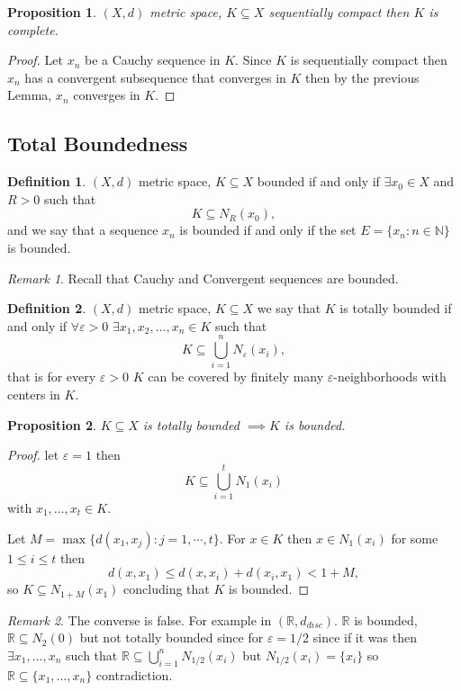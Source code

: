 \documentclass[11pt,openany]{book}
\theoremstyle{plain}
\newtheorem{proposition}{Proposition}[chapter]
\theoremstyle{definition}
\newtheorem{definition}{Definition}[chapter]
\theoremstyle{remark}
\newtheorem{remark}{Remark}[chapter]
\newcommand{\R}{\mathbb{R}}
\newcommand{\N}{\mathbb{N}}
\newcommand{\eps}{\varepsilon}
\begin{document}
\begin{proposition}\label{prop:sequentialimplycomplete}
    $(X,d)$ metric space, $K \subseteq X$ sequentially compact then $K$ is complete.
\end{proposition}

\begin{proof}
    Let $x_n$ be a Cauchy sequence in $K$. Since $K$ is sequentially compact then $x_n$ has a convergent subsequence that converges in $K$ then by the previous Lemma, $x_n$ converges in $K$.
\end{proof}



\subsection{Total Boundedness}
\begin{definition}
    $(X,d)$ metric space, $K \subseteq X$ bounded if and only if $\exists x_0 \in X$ and $R >0$ such that \[ K \subseteq N_R(x_0),\] and we say that a sequence $x_n$ is bounded if and only if the set $E = \{x_n : n \in \N\}$ is bounded.
\end{definition}
\begin{remark}
    Recall that Cauchy and Convergent sequences are bounded.
\end{remark}
\begin{definition}
    $(X,d)$ metric space, $K \subseteq X$ we say that $K$ is totally bounded if and only if $ \forall \eps > 0 $ $\exists x_1, x_2, \dots , x_n \in K$ such that \[ K \subseteq \bigcup_{i=1}^n N_{\eps}(x_i), \]
    that is for every $\eps>0$ $K$ can be covered by finitely many $\eps$-neighborhoods with centers in $K$.
\end{definition}
\begin{proposition}
    $K \subseteq X$ is totally bounded $\implies K$ is bounded.
\end{proposition}

\begin{proof}
    let $\eps = 1$ then $$K \subseteq \bigcup\limits_{i=1}^t N_1(x_i)$$ with $x_1, \dots, x_t \in K$. 
    
    Let $M=\max\{d(x_1,x_j):j=1,\cdots,t\}.$ For $x \in K$ then $x \in N_1(x_i)$ for some $ 1\le i \le t$ then $$d(x,x_1) \leq d(x,x_i) + d(x_i, x_1) < 1 +M,$$ so $K \subseteq N_{1+M}(x_1)$ concluding that $K$ is bounded.
\end{proof}

\begin{remark}
    The converse is false. For example in $(\R, d_{disc})$. $\R$ is bounded, $\R \subseteq N_2(0)$ but not totally bounded since for $\eps = 1/2$ since if it was then $\exists x_1, \dots , x_n$ such that $ \R \subseteq \bigcup\limits_{i=1}^n N_{1/2}(x_i)$ but $N_{1/2}(x_i) = \{x_i\}$ so $\R \subseteq \{x_1, \dots , x_n\}$ contradiction.
\end{remark}
\end{document}
